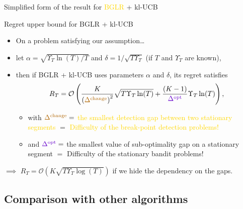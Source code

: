 \documentclass[11pt,french,ignorenonframetext,]{beamer}
\providecommand{\tightlist}{%
  \setlength{\itemsep}{0pt}\setlength{\parskip}{0pt}}
\begin{document}
\begin{frame}{Simplified form of the result for \textcolor{gold}{BGLR} + \textcolor{deeppurple}{kl-UCB}}

  \begin{block}{Regret upper bound for BGLR + kl-UCB \dCooley{}}
    \begin{itemize}
      \item
      On a problem satisfying our assumption\ldots
      \item
      let $\alpha = \sqrt{\Upsilon_T \ln(T) / T}$ and $\delta = 1 / \sqrt{T \Upsilon_T}$ (if $T$ and $\Upsilon_T$ are known),
      \pause
      \item
      then if BGLR + kl-UCB uses parameters $\alpha$ and $\delta$, its regret satisfies
      \[ R_T =\mathcal{O}\left( \frac{K}{\left(\textcolor{gold}{\Delta^{\text{change}}}\right)^2}\sqrt{T \Upsilon_T \ln(T)} + \frac{(K-1)}{\textcolor{deeppurple}{\Delta^{\text{opt}}}} \Upsilon_T\ln(T) \right),\]
      \begin{itemize}\tightlist
        \item
        with $\textcolor{gold}{\Delta^{\text{change}}} =$
        \textcolor{gold}{the smallest detection gap between two stationary segments}
        $=$ \textcolor{gold}{Difficulty of the break-point detection problems!}
        \item
        and $\textcolor{deeppurple}{\Delta^{\text{opt}}} =$
        \textcolor{deeppurple}{the smallest value of sub-optimality gap on a stationary segment}
        $=$ \textcolor{deeppurple}{Difficulty of the stationary bandit problems!}
      \end{itemize}
    \end{itemize}
  \end{block}

\pause
$\implies$ $R_T = \mathcal{O}(K \sqrt{T \Upsilon_T \log(T)})$ if we hide the dependency on the gaps.

\end{frame}


\subsection{\hfill{}Comparison with other algorithms\hfill{}}
\end{document}

